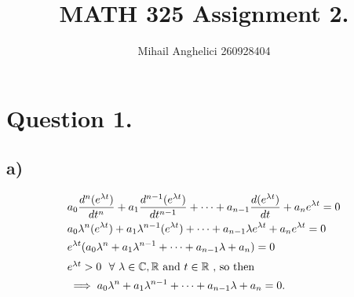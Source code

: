 \documentclass[
	12pt,
	]{article}
\title{MATH 325 Assignment 2.}
\author{Mihail Anghelici 260928404}
\date{\empty}
\theoremstyle{definition}
\theoremstyle{definition}
\theoremstyle{definition}
\theoremstyle{definition}
\theoremstyle{definition}
\theoremstyle{example}
\theoremstyle{note}
\theoremstyle{remark}
\theoremstyle{example}
\begin{document}
	\maketitle
	\section*{Question 1.}
		\subsection*{a)}
			\begin{align*}
				&a_{0}\frac{d^{n}(e^{\lambda t})}{dt^{n}} +a_{1}\frac{d^{n-1}(e^{\lambda t})}{dt^{n-1}} + \dots + a_{n-1}\frac{d(e^{\lambda t})}{dt} + 
				a_{n}e^{\lambda t} =0 \\
				& a_{0} \lambda^{n} (e^{\lambda t})+ a_{1} \lambda^{n-1}(e^{\lambda t}) + \dots + a_{n-1} \lambda e^{\lambda t} + a_{n} e^{\lambda t} =0 \\
				&e^{\lambda t} ( a_{0} \lambda^{n} + a_{1}\lambda^{n-1} + \dots + a_{n-1}\lambda + a_{n}) = 0\\
				\intertext{$e^{\lambda t} > 0 \ \ \forall \ \lambda \in \mathbb{C} , \mathbb{R} $ and  $t \in \mathbb{R}$ , so then} 
				& \implies a_{0}\lambda^{n} + a_{1} \lambda^{n-1} + \dots + a_{n-1}\lambda + a_{n} =0.
			\end{align*}
\end{document}
